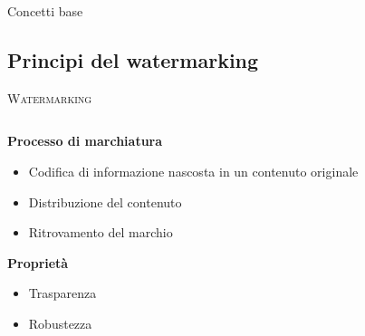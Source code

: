 \documentclass{beamer}
\begin{document}
\begin{section}{Concetti base}


\subsection {Principi del watermarking}
\begin{frame}[t]{\textsc{Watermarking}}
\begin{columns}
\begin{column}{5cm}
\vspace{1em}
\textbf{Processo di marchiatura}
\begin{itemize}
\item Codifica di informazione nascosta in un contenuto originale
\item Distribuzione del contenuto
\item Ritrovamento del marchio
\end{itemize}
\textbf{Propriet\`{a}}
\begin{itemize}
\item Trasparenza
\item Robustezza
\end{itemize}
\end{column}
\begin{column}{5cm}
\centering

\end{column}
\end{columns}
\end{frame}
\end{section}
\end{document}
